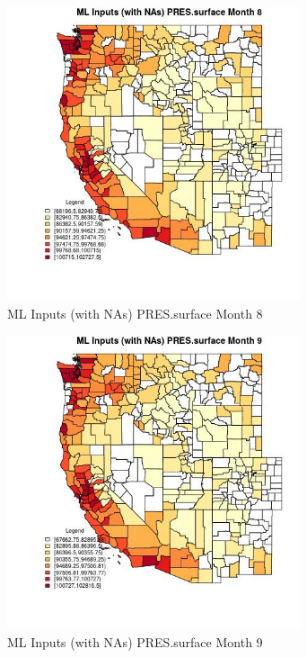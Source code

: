 \begin{figure} 
\centering  
\includegraphics[width=0.77\textwidth]{Code_Outputs/Report_ML_input_PM25_Step4_part_f_de_duplicated_aves_prioritize_24hr_obswNAs_CountyPRESsurfacemedianMonth8.jpg} 
\caption{\label{fig:Report_ML_input_PM25_Step4_part_f_de_duplicated_aves_prioritize_24hr_obswNAsCountyPRESsurfacemedianMonth8}ML Inputs (with NAs) PRES.surface Month 8} 
\end{figure} 
 

\begin{figure} 
\centering  
\includegraphics[width=0.77\textwidth]{Code_Outputs/Report_ML_input_PM25_Step4_part_f_de_duplicated_aves_prioritize_24hr_obswNAs_CountyPRESsurfacemedianMonth9.jpg} 
\caption{\label{fig:Report_ML_input_PM25_Step4_part_f_de_duplicated_aves_prioritize_24hr_obswNAsCountyPRESsurfacemedianMonth9}ML Inputs (with NAs) PRES.surface Month 9} 
\end{figure} 
 

